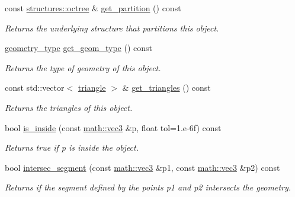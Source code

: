\begin{DoxyCompactItemize}
const \hyperlink{classphysim_1_1structures_1_1octree}{structures\+::octree} \& \hyperlink{classphysim_1_1geometric_1_1object_a618389ab9b30e9dea436165a6920b389}{get\+\_\+partition} () const
\begin{DoxyCompactList}\small\item\em Returns the underlying structure that partitions this object. \end{DoxyCompactList}\item 
\mbox{\label{classphysim_1_1geometric_1_1object_af631872682ea6a44bdebe5f9f9f98ab8}} 
\hyperlink{namespacephysim_1_1geometric_ac2794fff270c5b2ff4307f107a365fca}{geometry\+\_\+type} \hyperlink{classphysim_1_1geometric_1_1object_af631872682ea6a44bdebe5f9f9f98ab8}{get\+\_\+geom\+\_\+type} () const
\begin{DoxyCompactList}\small\item\em Returns the type of geometry of this object. \end{DoxyCompactList}\item 
const std\+::vector$<$ \hyperlink{classphysim_1_1geometric_1_1triangle}{triangle} $>$ \& \hyperlink{classphysim_1_1geometric_1_1object_a4bdf008b324fe8e1e1b83dbc47b5e897}{get\+\_\+triangles} () const
\begin{DoxyCompactList}\small\item\em Returns the triangles of this object. \end{DoxyCompactList}\item 
bool \hyperlink{classphysim_1_1geometric_1_1object_ade3bdbcb865c6b0910b8adfe2225be9b}{is\+\_\+inside} (const \hyperlink{structphysim_1_1math_1_1vec3}{math\+::vec3} \&p, float tol=1.e-\/6f) const
\begin{DoxyCompactList}\small\item\em Returns true if {\itshape p} is inside the object. \end{DoxyCompactList}\item 
bool \hyperlink{classphysim_1_1geometric_1_1object_a1bb905634af6176cc88680ce6f9fb080}{intersec\+\_\+segment} (const \hyperlink{structphysim_1_1math_1_1vec3}{math\+::vec3} \&p1, const \hyperlink{structphysim_1_1math_1_1vec3}{math\+::vec3} \&p2) const
\begin{DoxyCompactList}\small\item\em Returns if the segment defined by the points {\itshape p1} and {\itshape p2} intersects the geometry. \end{DoxyCompactList}\item 

\end{DoxyCompactItemize}
